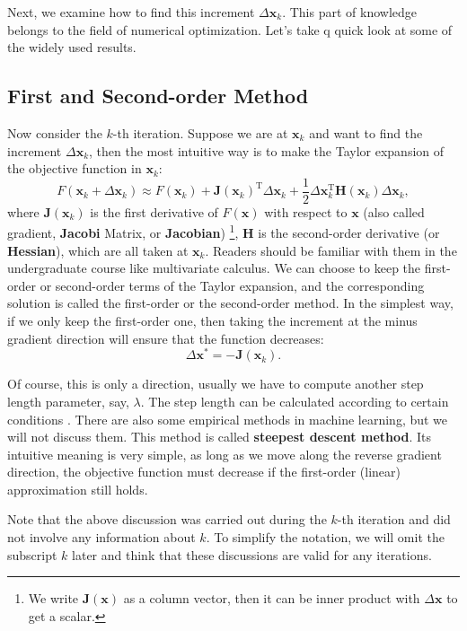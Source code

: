 Next, we examine how to find this increment $\Delta \bm{x}_k$. This part of knowledge belongs to the field of numerical optimization. Let's take q quick look at some of the widely used results.

\subsection{First and Second-order Method}
Now consider the $k$-th iteration. Suppose we are at $\bm{x}_k$ and want to find the increment $\Delta \bm{x}_k$, then the most intuitive way is to make the Taylor expansion of the objective function in $\bm{x}_k$:
\begin{equation}
    F(\bm{x}_k+\Delta \bm{x}_k) \approx F{\left( \bm{x}_k \right)} + \bm{J} \left( \bm{x}_k \right) ^\mathrm{T} \Delta \bm{x}_k + \frac{1}{2}\Delta {\bm{x}_k^\mathrm{T}}\bm{H}(\bm{ x}_k) \Delta \bm{x}_k,
\end{equation}
where $\bm{J}(\bm{x}_k)$ is the first derivative of $F(\bm{x})$ with respect to $\bm{x}$ (also called gradient, \textbf{Jacobi} Matrix, or \textbf{Jacobian}) \footnote{We write $\bm{J}(\bm{x})$ as a column vector, then it can be inner product with $\Delta \bm{x}$ to get a scalar. }, $\bm{H}$ is the second-order derivative (or \textbf{Hessian}), which are all taken at $\bm{x}_k$. Readers should be familiar with them in the undergraduate course like multivariate calculus. We can choose to keep the first-order or second-order terms of the Taylor expansion, and the corresponding solution is called the first-order or the second-order method. In the simplest way, if we only keep the first-order one, then taking the increment at the minus gradient direction will ensure that the function decreases: 
\begin{equation}
    \Delta \bm{x}^* =-\bm{J}(\bm{x}_k).
\end{equation}

Of course, this is only a direction, usually we have to compute another step length parameter, say, $\lambda$. The step length can be calculated according to certain conditions \textsuperscript{\cite{Wolfe1969}}. There are also some empirical methods in machine learning, but we will not discuss them. This method is called \textbf{steepest descent method}. Its intuitive meaning is very simple, as long as we move along the reverse gradient direction, the objective function must decrease if the first-order (linear) approximation still holds.

Note that the above discussion was carried out during the $k$-th iteration and did not involve any information about $k$. To simplify the notation, we will omit the subscript $k$ later and think that these discussions are valid for any iterations.

